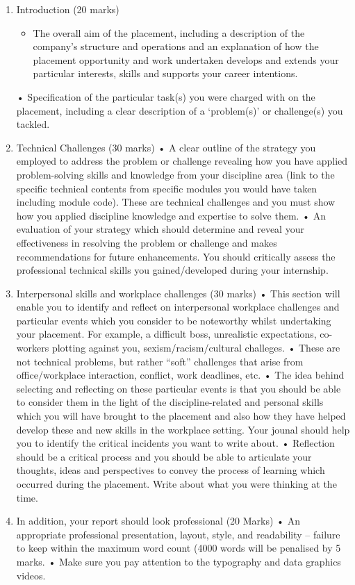 \documentclass[11pt]{article}
\begin{document}
\begin{enumerate}
\item Introduction (20 marks)
\begin{itemize}
\item The overall aim of the placement, including a description of the company’s structure and operations and an explanation of how the placement opportunity and work undertaken develops and extends your particular interests, skills and supports your career intentions.
\end{itemize}
• Specification of the particular task(s) you were charged with on the placement, including a clear description of a ‘problem(s)’ or challenge(s) you tackled.
\item Technical Challenges (30 marks)
• A clear outline of the strategy you employed to address the problem or challenge revealing how you have applied problem-solving skills and knowledge from your discipline area (link to the specific technical contents from specific modules you would have taken including module code). These are technical challenges and you must show how you applied discipline knowledge and expertise to solve them.
• An evaluation of your strategy which should determine and reveal your effectiveness in resolving the problem or challenge and makes recommendations for future enhancements. You should critically assess the professional technical skills you gained/developed during your internship.
\item Interpersonal skills and workplace challenges (30 marks)
• This section will enable you to identify and reflect on interpersonal workplace challenges and particular events which you consider to be noteworthy whilst undertaking your placement. For example, a difficult boss, unrealistic expectations, co- workers plotting against you, sexism/racism/cultural challeges.
• These are not technical problems, but rather “soft” challenges that arise from office/workplace interaction, conflict, work deadlines, etc.
• The idea behind selecting and reflecting on these particular events is that you should be able to consider them in the light of the discipline-related and personal skills which you will have brought to the placement and also how they have helped develop these and new skills in the workplace setting. Your jounal should help you to identify the critical incidents you want to write about.
• Reflection should be a critical process and you should be able to articulate your thoughts, ideas and perspectives to convey the process of learning which occurred during the placement. Write about what you were thinking at the time.
\item In addition, your report should look professional (20 Marks)
• An appropriate professional presentation, layout, style, and readability – failure to keep within the maximum word count (4000 words will be penalised by 5 marks.
• Make sure you pay attention to the typography and data graphics videos.
\end{enumerate}
\end{document}

